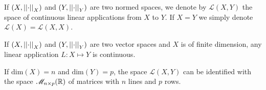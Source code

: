 \documentclass{article}
\begin{document}
\begin{definition}
	If $(X,\left|\left|\cdot\right|\right|_X)$ and $(Y,\left|\left|\cdot\right|\right|_Y)$ are two normed spaces, we denote by $\mathscr{L}(X,Y)$ the space of continuous linear applications from $X$ to $Y$. If $X=Y$ we simply denote $\mathscr{L}(X)=\mathscr{L}(X,X)$.
\end{definition}
\begin{proposition}
	If $(X,\left|\left|\cdot\right|\right|_X)$ and $(Y,\left|\left|\cdot\right|\right|_Y)$ are two vector spaces and $X$ is of finite dimension, any linear application $L:X\mapsto Y$ is continuous.
\end{proposition}
\begin{remark}
	If $\mathrm{dim}(X)=n$ and $\mathrm{dim}(Y)=p$, the space $\mathscr{L}(X,Y)$ can be identified with the space $\mathscr{M}_{n\times p}(\mathbb{R})$ of matrices with $n$ lines and $p$ rows.
\end{remark}
\end{document}
